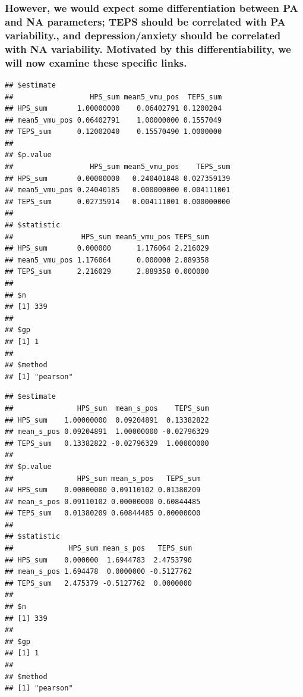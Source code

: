 \documentclass[
]{article}
\begin{document}
\hypertarget{however-we-would-expect-some-differentiation-between-pa-and-na-parameters-teps-should-be-correlated-with-pa-variability.-and-depressionanxiety-should-be-correlated-with-na-variability.-motivated-by-this-differentiability-we-will-now-examine-these-specific-links.}{%
\subsubsection{However, we would expect some differentiation between PA
and NA parameters; TEPS should be correlated with PA variability., and
depression/anxiety should be correlated with NA variability. Motivated
by this differentiability, we will now examine these specific
links.}\label{however-we-would-expect-some-differentiation-between-pa-and-na-parameters-teps-should-be-correlated-with-pa-variability.-and-depressionanxiety-should-be-correlated-with-na-variability.-motivated-by-this-differentiability-we-will-now-examine-these-specific-links.}}

\begin{verbatim}
## $estimate
##                  HPS_sum mean5_vmu_pos  TEPS_sum
## HPS_sum       1.00000000    0.06402791 0.1200204
## mean5_vmu_pos 0.06402791    1.00000000 0.1557049
## TEPS_sum      0.12002040    0.15570490 1.0000000
## 
## $p.value
##                  HPS_sum mean5_vmu_pos    TEPS_sum
## HPS_sum       0.00000000   0.240401848 0.027359139
## mean5_vmu_pos 0.24040185   0.000000000 0.004111001
## TEPS_sum      0.02735914   0.004111001 0.000000000
## 
## $statistic
##                HPS_sum mean5_vmu_pos TEPS_sum
## HPS_sum       0.000000      1.176064 2.216029
## mean5_vmu_pos 1.176064      0.000000 2.889358
## TEPS_sum      2.216029      2.889358 0.000000
## 
## $n
## [1] 339
## 
## $gp
## [1] 1
## 
## $method
## [1] "pearson"
\end{verbatim}

\begin{verbatim}
## $estimate
##               HPS_sum  mean_s_pos    TEPS_sum
## HPS_sum    1.00000000  0.09204891  0.13382822
## mean_s_pos 0.09204891  1.00000000 -0.02796329
## TEPS_sum   0.13382822 -0.02796329  1.00000000
## 
## $p.value
##               HPS_sum mean_s_pos   TEPS_sum
## HPS_sum    0.00000000 0.09110102 0.01380209
## mean_s_pos 0.09110102 0.00000000 0.60844485
## TEPS_sum   0.01380209 0.60844485 0.00000000
## 
## $statistic
##             HPS_sum mean_s_pos   TEPS_sum
## HPS_sum    0.000000  1.6944783  2.4753790
## mean_s_pos 1.694478  0.0000000 -0.5127762
## TEPS_sum   2.475379 -0.5127762  0.0000000
## 
## $n
## [1] 339
## 
## $gp
## [1] 1
## 
## $method
## [1] "pearson"
\end{verbatim}
\end{document}
